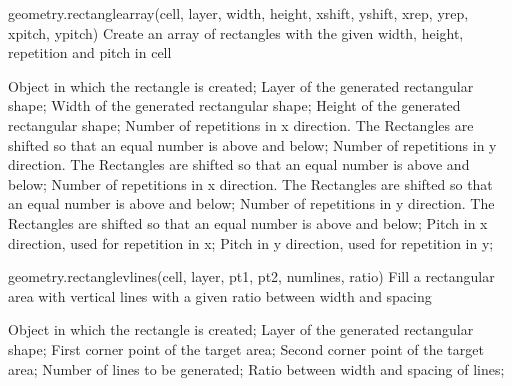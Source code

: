 \begin{APIfunc}{geometry.rectanglearray(cell, layer, width, height, xshift, yshift, xrep, yrep, xpitch, ypitch)}
    Create an array of rectangles with the given width, height, repetition and pitch in cell
    \begin{APIparameters}
            Object in which the rectangle is created;
            Layer of the generated rectangular shape;
            Width of the generated rectangular shape;
            Height of the generated rectangular shape;
            Number of repetitions in x direction. The Rectangles are shifted so that an equal number is above and below;
            Number of repetitions in y direction. The Rectangles are shifted so that an equal number is above and below;
            Number of repetitions in x direction. The Rectangles are shifted so that an equal number is above and below;
            Number of repetitions in y direction. The Rectangles are shifted so that an equal number is above and below;
            Pitch in x direction, used for repetition in x;
            Pitch in y direction, used for repetition in y;
    \end{APIparameters}
\end{APIfunc}
\begin{APIfunc}{geometry.rectanglevlines(cell, layer, pt1, pt2, numlines, ratio)}
    Fill a rectangular area with vertical lines with a given ratio between width and spacing
    \begin{APIparameters}
            Object in which the rectangle is created;
            Layer of the generated rectangular shape;
            First corner point of the target area;
            Second corner point of the target area;
            Number of lines to be generated;
            Ratio between width and spacing of lines;
    \end{APIparameters}
\end{APIfunc}
